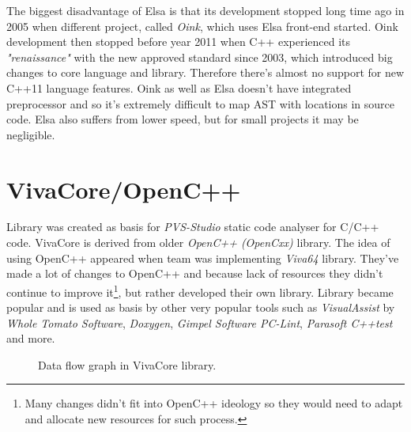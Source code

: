 The biggest disadvantage of Elsa is that its development stopped long time ago in 2005 when different project, called \emph{Oink}, which uses Elsa front-end started. Oink development then stopped before year 2011 when C++ experienced its \textit{"renaissance"} with the new approved standard since 2003, which introduced big changes to core language and library. Therefore there's almost no support for new C++11 language features. Oink as well as Elsa doesn't have integrated preprocessor and so it's extremely difficult to map AST with locations in source code. Elsa also suffers from lower speed, but for small projects it may be negligible.

\section{VivaCore/OpenC++}
Library was created as basis for \emph{PVS-Studio} static code analyser for C/C++ code. VivaCore is derived from older \emph{OpenC++ (OpenCxx)} library. The idea of using OpenC++ appeared when team was implementing \emph{Viva64} library. They've made a lot of changes to OpenC++ and because lack of resources they didn't continue to improve it\footnote{Many changes didn't fit into OpenC++ ideology so they would need to adapt and allocate new resources for such process.}, but rather developed their own library. Library became popular and is used as basis by other very popular tools such as  \emph{VisualAssist} by \emph{Whole Tomato Software}, \emph{Doxygen}, \emph{Gimpel Software PC-Lint}, \emph{Parasoft C++test} and more.

\begin{figure}[h!]
\label{vivacore}
\caption{Data flow graph in VivaCore library.}
\centering
{}
\end{figure}

